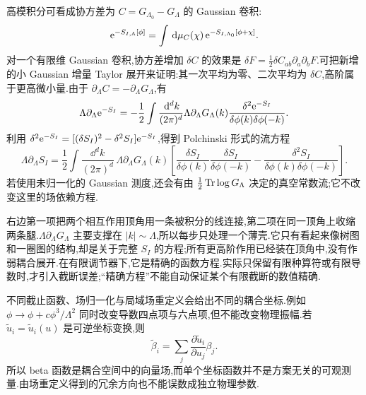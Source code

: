 高模积分可看成协方差为 $C=G_{\Lambda_0}-G_\Lambda$ 的 Gaussian 卷积:
\begin{equation}
 \mathrm e^{-S_{I,\Lambda}[\phi]}
 =\int\,\mathrm d\mu_C(\chi)\,\mathrm e^{-S_{I,\Lambda_0}[\phi+\chi]}.
 \label{eq:polchinski-gaussian-convolution}
\end{equation}
对一个有限维 Gaussian 卷积,协方差增加 $\delta C$ 的效果是
$\delta F=\tfrac12\delta C_{ab}\partial_a\partial_bF$.可把新增的小 Gaussian 增量 Taylor 展开来证明:其一次平均为零、二次平均为 $\delta C$,高阶属于更高微小量.由于 $\partial_\Lambda C=-\partial_\Lambda G_\Lambda$,有
\begin{equation}
 \Lambda\partial_\Lambda\mathrm e^{-S_I}
 =-\frac12\int\frac{\,\mathrm d^dk}{(2\pi)^d}
     \Lambda\partial_\Lambda G_\Lambda(k)
     \frac{\delta^2\mathrm e^{-S_I}}{\delta\phi(k)\delta\phi(-k)}.
\end{equation}
利用 $\delta^2\mathrm e^{-S_I}=[(\delta S_I)^2-\delta^2S_I]\mathrm e^{-S_I}$,得到 Polchinski 形式的流方程
\begin{equation}
 \Lambda\partial_\Lambda S_I=
 \frac12\int\frac{\dd^dk}{(2\pi)^d}\,
 \Lambda\partial_\Lambda G_\Lambda(k)
 \left[\frac{\delta S_I}{\delta\phi(k)}
       \frac{\delta S_I}{\delta\phi(-k)}
       -\frac{\delta^2S_I}{\delta\phi(k)\delta\phi(-k)}\right].
 \label{eq:polchinski-flow}
\end{equation}
若使用未归一化的 Gaussian 测度,还会有由 $\tfrac12\operatorname{Tr}\log G_\Lambda$ 决定的真空常数流;它不改变这里的场依赖方程.

右边第一项把两个相互作用顶角用一条被积分的线连接,第二项在同一顶角上收缩两条腿.$\Lambda\partial_\Lambda G_\Lambda$ 主要支撑在 $|k|\sim\Lambda$,所以每步只处理一个薄壳.它只有看起来像树图和一圈图的结构,却是关于完整 $S_I$ 的方程;所有更高阶作用已经装在顶角中,没有作弱耦合展开.在有限调节器下,它是精确的函数方程.实际只保留有限种算符或有限导数时,才引入截断误差;“精确方程”不能自动保证某个有限截断的数值精确.

不同截止函数、场归一化与局域场重定义会给出不同的耦合坐标.例如 $\phi\to\phi+c\phi^3/\Lambda^2$ 同时改变导数四点项与六点项,但不能改变物理振幅.若 $\widetilde u_i=\widetilde u_i(u)$ 是可逆坐标变换,则
\begin{equation}
 \widetilde\beta_i=\sum_j\frac{\partial\widetilde u_i}{\partial u_j}\beta_j.
 \label{eq:beta-coordinate-vector}
\end{equation}
所以 beta 函数是耦合空间中的向量场,而单个坐标函数并不是方案无关的可观测量.由场重定义得到的冗余方向也不能误数成独立物理参数.


